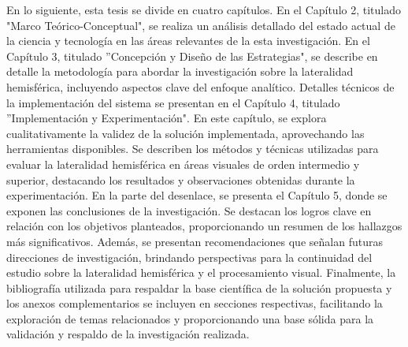 En lo siguiente, esta tesis se divide en cuatro capítulos.  En el Capítulo 2, titulado "Marco Teórico-Conceptual", se realiza un análisis detallado del estado actual de la ciencia y tecnología en las áreas relevantes de la esta investigaci\'on. En el Capítulo 3, titulado ''Concepción y Diseño de las Estrategias", se describe en detalle la metodología para abordar la investigación sobre la lateralidad hemisférica, incluyendo aspectos clave del enfoque analítico. Detalles técnicos de la implementación del sistema se presentan en el Capítulo 4, titulado ''Implementación y Experimentación". En este capítulo, se explora cualitativamente la validez de la solución implementada, aprovechando las herramientas disponibles. Se describen los métodos y técnicas utilizadas para evaluar la lateralidad hemisférica en áreas visuales de orden intermedio y superior, destacando los resultados y observaciones obtenidas durante la experimentación. En la parte del desenlace, se presenta el Capítulo 5, donde se exponen las conclusiones de la investigación. Se destacan los logros clave en relación con los objetivos planteados, proporcionando un resumen de los hallazgos más significativos. Además, se presentan recomendaciones que señalan futuras direcciones de investigación, brindando perspectivas para la continuidad del estudio sobre la lateralidad hemisférica y el procesamiento visual. Finalmente, la bibliografía utilizada para respaldar la base científica de la solución propuesta y los anexos complementarios se incluyen en secciones respectivas, facilitando la exploración de temas relacionados y proporcionando una base sólida para la validación y respaldo de la investigación realizada.

